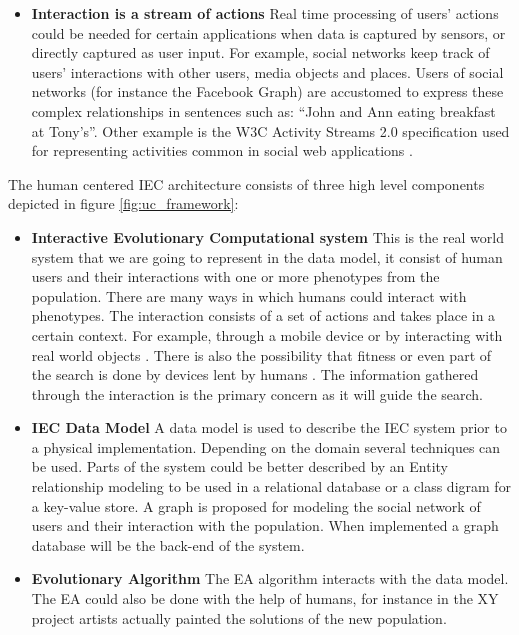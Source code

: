\begin{itemize}
\item {\bf Interaction is a stream of actions}
  Real time processing of users' actions could be needed for certain applications when data is 
  captured by sensors, or directly captured as user input. For example, social networks keep track of 
  users' interactions with other users, media objects and places. Users of 
  social networks (for instance the Facebook Graph) are accustomed to express these 
  complex relationships in sentences such as: ``John and Ann eating breakfast at Tony's''. 
  Other example is the W3C Activity Streams 2.0 specification used for representing activities 
  common in social web applications \cite{json:streams}. 
\end{itemize}

The human centered IEC architecture consists of three high level components depicted
in figure \ref{fig:uc_framework}:

\begin{itemize}
  \item {\bf Interactive Evolutionary Computational system} 
  This is the real world system that we are going to represent in the data model, 
  it consist of human users and their interactions with one or more phenotypes
  from the population. There are many ways in which humans could interact 
  with phenotypes. The interaction consists of a set of actions and 
  takes place in a certain context. For example, through a mobile device  
  or by interacting with real world objects 
  \cite{de2014artists,de2013unplugging}. 
  There is also the possibility that fitness or even part of the search 
  is done by devices lent by humans \cite{DBLP:conf/gecco/MereloCGCRV16}.
  The information gathered through the interaction is the primary concern
  as it will guide the search. 

  \item {\bf IEC Data Model}
  A data model is used to describe the IEC system prior to a physical 
  implementation.  Depending on the domain several techniques can be used.
  Parts of the system could be better described by an Entity relationship 
  modeling to be used in a relational database or a class digram for a 
  key-value store. A graph is proposed for modeling the social network of users 
  and their interaction with the population. When implemented a graph database 
  will be the back-end of the system. 

  \item {\bf Evolutionary Algorithm} 
  The EA algorithm interacts with the data model. The EA could also be done with the help of
  humans, for instance in the XY project \cite{de2013unplugging} artists actually painted
  the solutions of the new population.  
\end{itemize}

